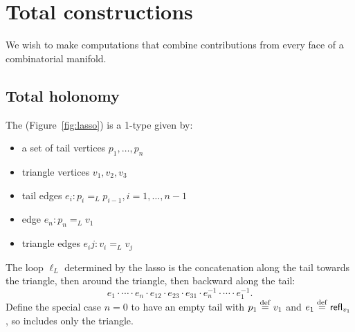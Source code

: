 \section{Total constructions}
We wish to make computations that combine contributions from every face of a combinatorial manifold.

\subsection{Total holonomy}
\begin{mydef}
The  (Figure~\ref{fig:lasso}) is a 1-type given by:
\begin{itemize}
\item a set of tail vertices \( p_1,\ldots,p_n \)
\item triangle vertices \( v_1, v_2, v_3 \)
\item tail edges \( e_i:p_i=_L p_{i-1}, i=1,\ldots,n-1 \)
\item edge \( e_n:p_n=_L v_1 \)
\item triangle edges \( e_ij:v_i=_L v_j \)
\end{itemize}
The loop \( \ell_L \) determined by the lasso is the concatenation along the tail towards the triangle, then around the triangle, then backward along the tail:\[ e_1\cdot\cdots\cdot e_n\cdot e_{12}\cdot e_{23} \cdot e_{31}\cdot e_n^{-1}\cdot\cdots\cdot e_1^{-1}. \]
Define the special case \( n=0 \) to have an empty tail with \( p_1\stackrel{\mathrm{def}}{=} v_1 \) and \( e_1\stackrel{\mathrm{def}}{=}\mathsf{refl}_{v_1} \), so includes only the triangle.
\end{mydef}
